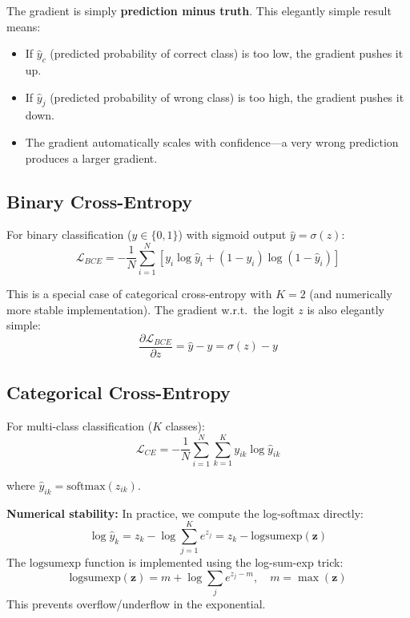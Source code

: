 The gradient is simply \textbf{prediction minus truth}. This elegantly simple result means:
\begin{itemize}
    \item If $\hat{y}_c$ (predicted probability of correct class) is too low, the gradient pushes it up.
    \item If $\hat{y}_j$ (predicted probability of wrong class) is too high, the gradient pushes it down.
    \item The gradient automatically scales with confidence---a very wrong prediction produces a larger gradient.
\end{itemize}

\subsection{Binary Cross-Entropy}

For binary classification ($y \in \{0, 1\}$) with sigmoid output $\hat{y} = \sigma(z)$:
\begin{equation}
\mathcal{L}_{BCE} = -\frac{1}{N}\sum_{i=1}^{N}\left[y_i \log \hat{y}_i + (1-y_i) \log(1-\hat{y}_i)\right]
\end{equation}

This is a special case of categorical cross-entropy with $K = 2$ (and numerically more stable implementation). The gradient w.r.t.\ the logit $z$ is also elegantly simple:
\begin{equation}
\frac{\partial \mathcal{L}_{BCE}}{\partial z} = \hat{y} - y = \sigma(z) - y
\end{equation}

\subsection{Categorical Cross-Entropy}

For multi-class classification ($K$ classes):
\begin{equation}
\mathcal{L}_{CE} = -\frac{1}{N}\sum_{i=1}^{N}\sum_{k=1}^{K} y_{ik} \log \hat{y}_{ik}
\end{equation}

where $\hat{y}_{ik} = \text{softmax}(z_{ik})$.

\textbf{Numerical stability:} In practice, we compute the log-softmax directly:
\begin{equation}
\log \hat{y}_k = z_k - \log \sum_{j=1}^{K} e^{z_j} = z_k - \text{logsumexp}(\mathbf{z})
\end{equation}
The $\text{logsumexp}$ function is implemented using the log-sum-exp trick:
\begin{equation}
\text{logsumexp}(\mathbf{z}) = m + \log \sum_{j} e^{z_j - m}, \quad m = \max(\mathbf{z})
\end{equation}
This prevents overflow/underflow in the exponential.

